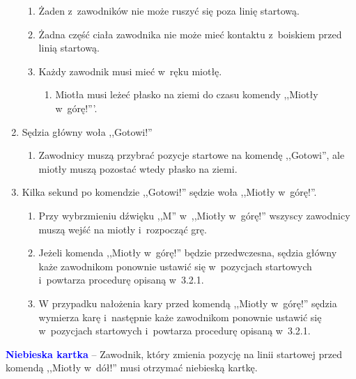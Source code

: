 \documentclass[12pt,a4paper]{article}
\newcommand\bluecard[1]{\bgroup\textcolor{blue}{\textbf{#1}}}
\begin{document}
\begin{enumerate}
	      \begin{enumerate}
		      \item
		            Żaden z~zawodników nie może ruszyć się poza linię startową.
		      \item
		            Żadna część ciała zawodnika nie może mieć kontaktu z~boiskiem przed
		            linią startową.
		      \item
		            Każdy zawodnik musi mieć w~ręku miotłę.

		            \begin{enumerate}
			            \item
			                  Miotła musi leżeć płasko na ziemi do czasu komendy ,,Miotły w~górę!'''.
		            \end{enumerate}
	      \end{enumerate}
	\item
	      Sędzia główny woła ,,Gotowi!''

	      \begin{enumerate}
		      \item
		            Zawodnicy muszą przybrać pozycje startowe na komendę ,,Gotowi'', ale
		            miotły muszą pozostać wtedy płasko na ziemi.
	      \end{enumerate}
	\item
	      Kilka sekund po komendzie ,,Gotowi!'' sędzie woła ,,Miotły w~górę!''.

	      \begin{enumerate}
		      \item
		            Przy wybrzmieniu dźwięku ,,M'' w~,,Miotły w~górę!'' wszyscy
		            zawodnicy muszą wejść na miotły i~rozpocząć grę.
		      \item
		            Jeżeli komenda ,,Miotły w~górę!'' będzie przedwczesna, sędzia główny
		            każe zawodnikom ponownie ustawić się w~pozycjach startowych i~powtarza procedurę opisaną w~3.2.1.
		      \item
		            W przypadku nałożenia kary przed komendą ,,Miotły w~górę!'' sędzia
		            wymierza karę i~następnie każe zawodnikom ponownie ustawić się w~pozycjach startowych i~powtarza procedurę opisaną w~3.2.1.
	      \end{enumerate}
\end{enumerate}

\bluecard{Niebieska kartka} -- Zawodnik, który zmienia pozycję na linii
startowej przed komendą ,,Miotły w~dół!'' musi otrzymać niebieską
kartkę.
\end{document}

